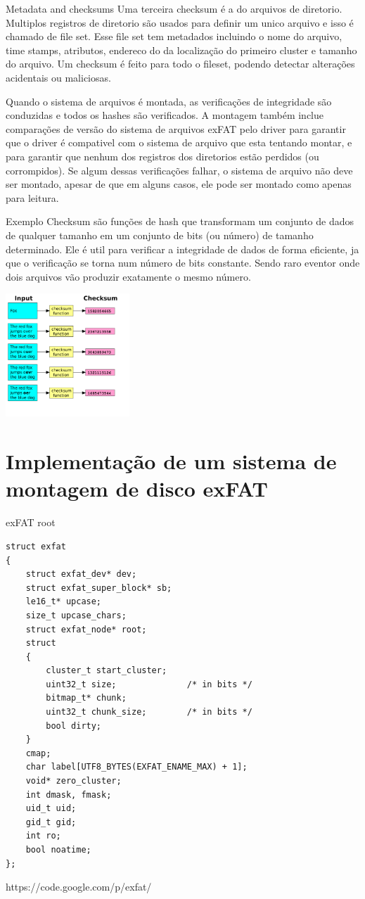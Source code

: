 \documentclass[11pt]{beamer}
\begin{document}
\begin{frame}{Metadata and checksums}
Uma terceira checksum é a do arquivos de diretorio. Multiplos registros de diretorio são usados para definir um unico arquivo e isso é chamado de file set. Esse file set tem metadados incluindo o nome do arquivo, time stamps, atributos, endereco do da localização do primeiro cluster e tamanho do arquivo. Um checksum é feito para todo o fileset, podendo detectar alterações acidentais ou maliciosas.

Quando o sistema de arquivos é montada, as verificações de integridade são conduzidas e todos os hashes são verificados. A montagem também inclue comparações de versão do sistema de arquivos exFAT pelo driver para garantir que o driver é compativel com o sistema de arquivo que esta tentando montar, e para garantir que nenhum dos registros dos diretorios estão perdidos (ou corrompidos). Se algum dessas verificações falhar, o sistema de arquivo não deve ser montado, apesar de que em alguns casos, ele pode ser montado como apenas para leitura.
\end{frame}

\begin{frame}{Exemplo}
Checksum são funções de hash que transformam um conjunto de dados de qualquer tamanho em um conjunto de bits (ou número) de tamanho determinado. Ele é util para verificar a integridade de dados de forma eficiente, ja que o verificação se torna num número de bits constante. Sendo raro eventor onde dois arquivos vão produzir exatamente o mesmo número.

\begin{center}
 \includegraphics[width=0.35\textwidth]{checksum.png} 
\end{center}
\end{frame}


\section{Implementação de um sistema de montagem de disco exFAT}
\begin{frame}[fragile]{exFAT root}
\begin{lstlisting}
struct exfat
{
	struct exfat_dev* dev;
	struct exfat_super_block* sb;
	le16_t* upcase;
	size_t upcase_chars;
	struct exfat_node* root;
	struct
	{
		cluster_t start_cluster;
		uint32_t size;				/* in bits */
		bitmap_t* chunk;
		uint32_t chunk_size;		/* in bits */
		bool dirty;
	}
	cmap;
	char label[UTF8_BYTES(EXFAT_ENAME_MAX) + 1];
	void* zero_cluster;
	int dmask, fmask;
	uid_t uid;
	gid_t gid;
	int ro;
	bool noatime;
};
\end{lstlisting}
https://code.google.com/p/exfat/
\end{frame}
\end{document}
